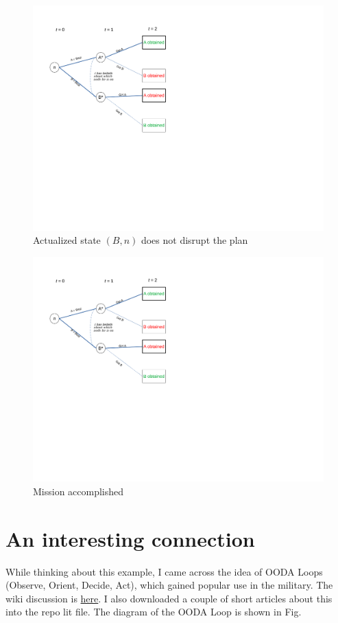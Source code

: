 \documentclass[
11pt,
titlepage,
reqno,
]{article}%
\theoremstyle{definition}
\begin{document}
\begin{figure}[h!]
	\centering
	\includegraphics*[page=12,trim = 0in 5in 3in 0in,scale=.65]{Awareness_Diagrams_All}
	\caption{Actualized state $(B,n)$ does not disrupt the plan\label{Diag: p-12}}%
\end{figure}

\begin{figure}[h!]
	\centering
	\includegraphics*[page=13,trim = 0in 5in 3in 0in,scale=.65]{Awareness_Diagrams_All}
	\caption{Mission accomplished\label{Diag: p-13}}%
\end{figure}


\section*{An interesting connection}
While thinking about this example, I came across the idea of OODA Loops (Observe, Orient, Decide, Act), which gained popular use in the military. The wiki discussion is \href{https://en.wikipedia.org/wiki/OODA_loop}{here}. I also downloaded a couple of short articles about this into the repo lit file. The diagram of the OODA Loop  is shown in Fig. 
\end{document}
